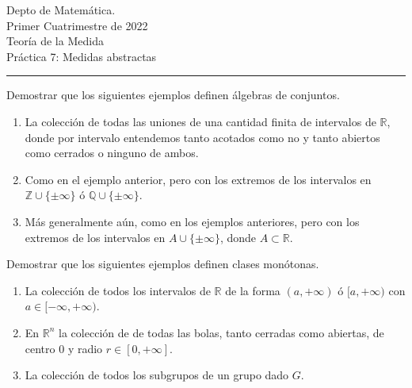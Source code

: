 \documentclass{book}
\begin{document}


\begin{large}
\begin{bfseries} %
        \noindent Depto de Matem\'atica.\\
        Primer Cuatrimestre de 2022\\                                                                                                                                                                                                                                                                                                                                                
        Teoría de la Medida \\
        Práctica 7: Medidas abstractas

\end{bfseries}
\end{large}
\par\noindent\rule{\textwidth}{.5pt}



\begin{ejer}{} Demostrar que los siguientes ejemplos definen álgebras de conjuntos.
 \begin{enumerate}
  \item La colección de todas las uniones de una cantidad finita de intervalos de $\mathbb{R}$, donde por intervalo entendemos tanto acotados como  no y tanto abiertos como cerrados o ninguno de ambos.
  \item Como en el ejemplo anterior, pero con los extremos de los intervalos en $\mathbb{Z}\cup \{\pm \infty\}$ ó $\mathbb{Q}\cup \{\pm \infty\}$.
    \item Más generalmente aún, como en los ejemplos anteriores, pero con los extremos de los intervalos en $A\cup \{\pm \infty\}$, donde $A\subset\mathbb{R}$.
 \end{enumerate}
\end{ejer}


\begin{ejer}{} Demostrar que los siguientes ejemplos definen clases monótonas.
 \begin{enumerate}
  \item La colección de todos los intervalos de $\mathbb{R}$ de la forma $(a,+\infty)$ ó $[a,+\infty)$ con $a\in [-\infty,+\infty)$.
  \item En $\mathbb{R}^n$ la colección de de todas las bolas, tanto cerradas como abiertas, de centro $0$ y radio $r\in[0,+\infty]$. 
  \item La colección de todos los subgrupos de un grupo dado $G$. 
 \end{enumerate}
\end{ejer}
\end{document}
